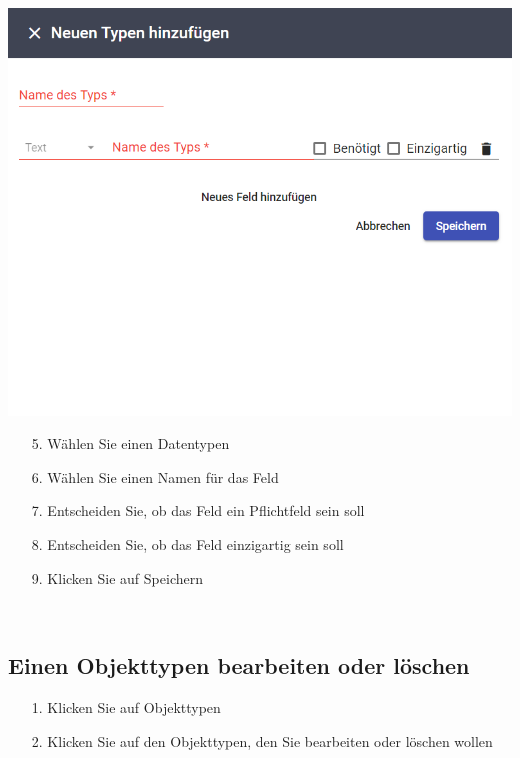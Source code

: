 \documentclass[11pt,a4paper]{report}
\begin{document}
	\begin{minipage}{0.5\linewidth}
	\includegraphics[width=\linewidth]{Objekttypadd.png}
	\end{minipage}
	\hfill
	\begin{minipage}{0.4\linewidth}
	\begin{itemize}
		\item[5.] Wählen Sie einen Datentypen
		\item[6.] Wählen Sie einen Namen für das Feld
		\item[7.] Entscheiden Sie, ob das Feld ein Pflichtfeld sein soll
		\item[8.] Entscheiden Sie, ob das Feld einzigartig sein soll
		\item[9.] Klicken Sie auf Speichern
	\end{itemize}
	\end{minipage}\\

	\subsection{Einen Objekttypen bearbeiten oder löschen}

	\begin{itemize}
		\item[1.] Klicken Sie auf \glqq{}Objekttypen\grqq{}
		\item[2.] Klicken Sie auf den Objekttypen, den Sie bearbeiten oder löschen wollen
	\end{itemize}
\end{document}
